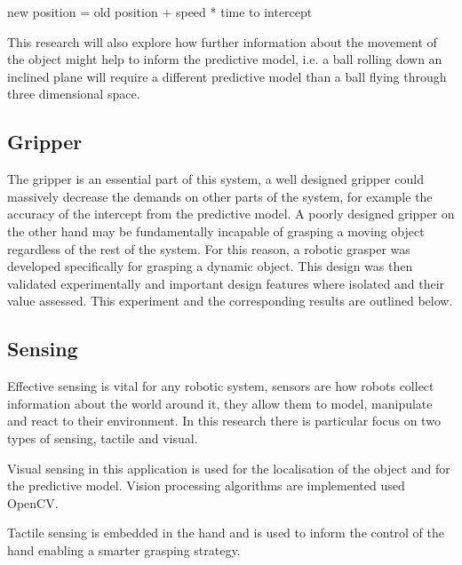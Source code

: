 new position = old position + speed * time to intercept

This research will also explore how further information about the movement of the object might help to inform the predictive model, i.e. a ball rolling down an inclined plane will require a different predictive model than a ball flying through three dimensional space.  

\subsection{Gripper}
The gripper is an essential part of this system, a well designed gripper could massively decrease the demands on other parts of the system, for example the accuracy of the intercept from the predictive model. A poorly designed gripper on the other hand may be fundamentally incapable of grasping a moving object regardless of the rest of the system. For this reason, a robotic grasper was developed specifically for grasping a dynamic object. This design was then validated experimentally and important design features where isolated and their value assessed. This experiment and the corresponding results are outlined below.

\subsection{Sensing}
Effective sensing is vital for any robotic system, sensors are how robots collect information about the world around it, they allow them to model, manipulate and react to their environment. In this research there is particular focus on two types of sensing, tactile and visual.

Visual sensing in this application is used for the localisation of the object and for the predictive model. Vision processing algorithms are implemented used OpenCV.

Tactile sensing is embedded in the hand and is used to inform the control of the hand enabling a smarter grasping strategy.


